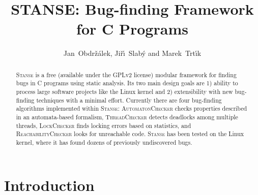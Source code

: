 \documentclass{llncs}
\newcommand{\Stanse}{\textsc{Stanse}\xspace}
\newcommand{\TC}{\textsc{ThreadChecker}\xspace}
\newcommand{\AC}{\textsc{AutomatonChecker}\xspace}
\newcommand{\RC}{\textsc{ReachabilityChecker}\xspace}
\newcommand{\LC}{\textsc{LockChecker}\xspace}
\begin{document}

\title{{STANSE}: Bug-finding Framework\\ for C Programs}

\author{Jan~Obdr\v{z}\'alek, Ji\v{r}\'\i~Slab\'y and Marek~Trt\'{\i}k}

\maketitle

\begin{abstract}
  \Stanse is a free (available under the GPLv2 license) modular framework
  for finding bugs in C programs using static analysis. Its two main design
  goals are 1) ability to process large software projects like the Linux kernel and
  2) extensibility with new bug-finding techniques with a minimal effort.
  Currently there are four bug-finding algorithms implemented within
  \Stanse: \AC checks properties described in an automata-based formalism,
  \TC detects deadlocks among multiple threads, \LC finds locking errors based
  on statistics, and \RC looks for
  unreachable code. \Stanse has been tested on the Linux kernel, where it
  has found dozens of previously undiscovered bugs.
\end{abstract}



\section{Introduction}
\label{sec:introduction}
\end{document}
